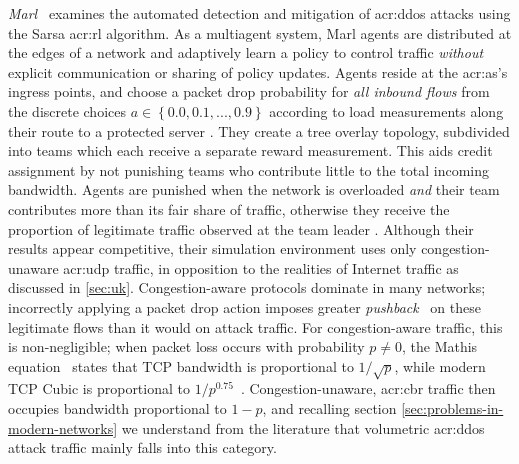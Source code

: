 \emph{Marl}~\parencite{DBLP:conf/iaai/MalialisK13,DBLP:journals/eaai/MalialisK15} examines the automated detection and mitigation of \gls{acr:ddos} attacks using the Sarsa \gls{acr:rl} algorithm.
As a multiagent system, Marl agents are distributed at the edges of a network and adaptively learn a policy to control traffic \emph{without} explicit communication or sharing of policy updates.
Agents reside at the \gls{acr:as}'s ingress points, and choose a packet drop probability for \emph{all inbound flows} from the discrete choices $a\in\left\{0.0,0.1,...,0.9\right\}$ \prllitact{} according to load measurements along their route to a protected server \prllitstate.
They create a tree overlay topology, subdivided into teams which each receive a separate reward measurement.
This aids credit assignment by not punishing teams who contribute little to the total incoming bandwidth.
Agents are punished when the network is overloaded \emph{and} their team contributes more than its fair share of traffic, otherwise they receive the proportion of legitimate traffic observed at the team leader \prllitreward.
Although their results appear competitive, their simulation environment uses only congestion-unaware \gls{acr:udp} traffic, in opposition to the realities of Internet traffic as discussed in \cref{sec:uk}.
Congestion-aware protocols dominate in many networks; incorrectly applying a packet drop action imposes greater \emph{pushback}~\parencite{DBLP:journals/ccr/MahajanBFIPS02a} on these legitimate flows than it would on attack traffic.
For congestion-aware traffic, this is non-negligible; when packet loss occurs with probability $p\ne0$, the Mathis equation~\parencite{DBLP:journals/ccr/MathisSMO97} states that TCP bandwidth is proportional to $1/\sqrt{p}$, while modern TCP Cubic is proportional to $1/p^{0.75}$~\parencite{rfc8312}.
Congestion-unaware, \gls{acr:cbr} traffic then occupies bandwidth proportional to $1 - p$, and recalling section \cref{sec:problems-in-modern-networks} we understand from the literature that volumetric \gls{acr:ddos} attack traffic mainly falls into this category.
